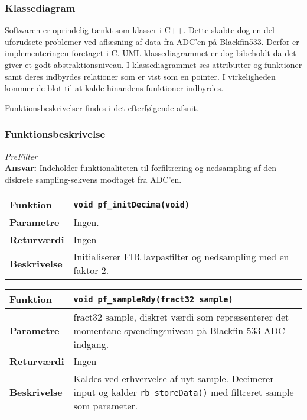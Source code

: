 \subsubsection*{Klassediagram}
Softwaren er oprindelig tænkt som klasser i C++. Dette skabte dog en del uforudsete problemer ved aflæsning af data fra ADC'en på Blackfin533. Derfor er implementeringen foretaget i C. UML-klassediagrammet er dog bibeholdt da det giver et godt abstraktionsniveau. I klassediagrammet ses attributter og funktioner samt deres indbyrdes relationer som er vist som en pointer. I virkeligheden kommer de blot til at kalde hinandens funktioner indbyrdes. 

Funktionsbeskrivelser findes i det efterfølgende afsnit. 

\subsubsection*{Funktionsbeskrivelse}

\textit{PreFilter} \\
\textbf{Ansvar:} Indeholder funktionaliteten til forfiltrering og nedsampling af den diskrete sampling-sekvens modtaget fra ADC'en.


\begin{center}
    \begin{tabular}{ | l | p{} |}
    \hline
    \textbf{Funktion}	& \verb+void pf_initDecima(void) +						\\ \hline
    \textbf{Parametre} 	& Ingen. 											\\ \hline
    \textbf{Returværdi}	& Ingen																				\\ \hline
    \textbf{Beskrivelse}	& Initialiserer FIR lavpasfilter og nedsampling med en faktor 2.		\\ \hline
    \end{tabular}
\end{center}

\begin{center}
    \begin{tabular}{ | l | p{} |}
    \hline
    \textbf{Funktion}	& \verb+void pf_sampleRdy(fract32 sample) +						\\ \hline
    \textbf{Parametre} 	& fract32 sample, diskret værdi som repræsenterer det momentane spændingsniveau på Blackfin 533 ADC indgang.		\\ \hline
    \textbf{Returværdi}	& Ingen 								\\ \hline
    \textbf{Beskrivelse}	& Kaldes ved erhvervelse af nyt sample. Decimerer input og kalder \verb+rb_storeData()+ med filtreret sample som parameter.\\ \hline
    \end{tabular}
\end{center}

